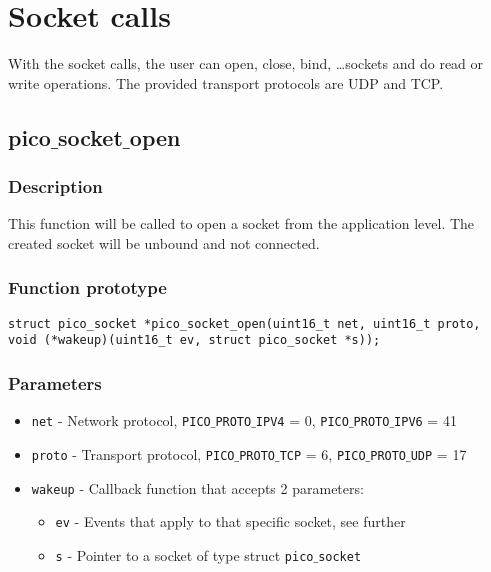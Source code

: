 \section{Socket calls}

With the socket calls, the user can open, close, bind, \ldots sockets and do read
or write operations. The provided transport protocols are UDP and TCP.

\subsection{pico$\_$socket$\_$open}

\subsubsection*{Description}
This function will be called to open a socket from the application level. The created
socket will be unbound and not connected. 

\subsubsection*{Function prototype}
\begin{verbatim}
struct pico_socket *pico_socket_open(uint16_t net, uint16_t proto,
void (*wakeup)(uint16_t ev, struct pico_socket *s));
\end{verbatim}

\subsubsection*{Parameters}
\begin{itemize}[noitemsep]
\item \texttt{net} - Network protocol, \texttt{PICO$\_$PROTO$\_$IPV4} = 0, \texttt{PICO$\_$PROTO$\_$IPV6} = 41
\item \texttt{proto} - Transport protocol, \texttt{PICO$\_$PROTO$\_$TCP} = 6, \texttt{PICO$\_$PROTO$\_$UDP} = 17
\item \texttt{wakeup} - Callback function that accepts 2 parameters:
\begin{itemize}[noitemsep]
\item \texttt{ev} - Events that apply to that specific socket, see further
\item \texttt{s} - Pointer to a socket of type struct \texttt{pico$\_$socket}
\end{itemize}
\end{itemize}

